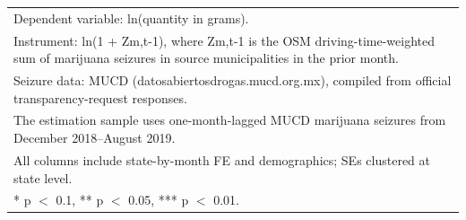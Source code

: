 \begin{table}[H]
\begin{tabular}[t]{lccccc}
\multicolumn{6}{l}{\rule{0pt}{1em}Dependent variable: ln(quantity in grams).}\\
\multicolumn{6}{l}{\rule{0pt}{1em}Instrument: ln(1 + Zm,t-1), where Zm,t-1 is the OSM driving-time-weighted sum of marijuana seizures in source municipalities in the prior month.}\\
\multicolumn{6}{l}{\rule{0pt}{1em}Seizure data: MUCD (datosabiertosdrogas.mucd.org.mx), compiled from official transparency-request responses.}\\
\multicolumn{6}{l}{\rule{0pt}{1em}The estimation sample uses one-month-lagged MUCD marijuana seizures from December 2018--August 2019.}\\
\multicolumn{6}{l}{\rule{0pt}{1em}All columns include state-by-month FE and demographics; SEs clustered at state level.}\\
\multicolumn{6}{l}{\rule{0pt}{1em}* p $<$ 0.1, ** p $<$ 0.05, *** p $<$ 0.01.}\\
\end{tabular}
\end{table}
